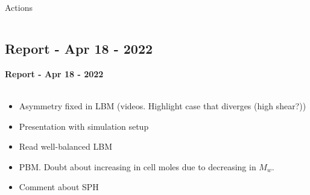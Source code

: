 \documentclass[8pt]{beamer}
\begin{document}
	\begin{frame}{Actions}
		\begin{columns}
			
			
			
			
		\end{columns}
	\end{frame}
	
	
	\subsection{Report - Apr 18 - 2022}
	\label{}
	\justifying
	\begin{frame}{}
		\textbf{Report - Apr 18 - 2022}\\~\\
		\begin{itemize}
			\item Asymmetry fixed in LBM (videos. Highlight case that diverges (high shear?))
			\item Presentation with simulation setup
			\item Read well-balanced LBM 
			\item PBM. Doubt about increasing in cell moles due to decreasing in $M_w$.
			\item Comment about SPH
		\end{itemize}
	\end{frame}
	
\end{document}
